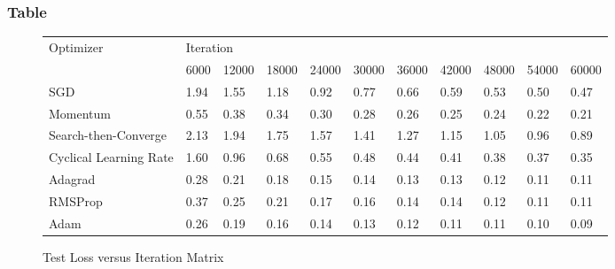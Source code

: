 \documentclass{article}
\begin{document}
\subsubsection{Table}
\begin{figure}[H]
	\begin{table}[H]
		\hskip-2.0cm\begin{tabular}{@{}|l|l|l|l|l|l|l|l|l|l|l|@{}}
			\toprule
			\multirow{2}{*}{Optimizer} & \multicolumn{10}{l|}{Iteration}                                              \\ \cmidrule(l){2-11} 
			& 6000 & 12000 & 18000 & 24000 & 30000 & 36000 & 42000 & 48000 & 54000 & 60000 \\ \midrule
			SGD                        & 1.94 & 1.55  & 1.18  & 0.92  & 0.77  & 0.66  & 0.59  & 0.53  & 0.50  & 0.47  \\ \midrule
			Momentum                   & 0.55 & 0.38  & 0.34  & 0.30  & 0.28  & 0.26  & 0.25  & 0.24  & 0.22  & 0.21  \\ \midrule
			Search-then-Converge       & 2.13 & 1.94  & 1.75  & 1.57  & 1.41  & 1.27  & 1.15  & 1.05  & 0.96  & 0.89  \\ \midrule
			Cyclical Learning Rate     & 1.60 & 0.96  & 0.68  & 0.55  & 0.48  & 0.44  & 0.41  & 0.38  & 0.37  & 0.35  \\ \midrule
			Adagrad                    & 0.28 & 0.21  & 0.18  & 0.15  & 0.14  & 0.13  & 0.13  & 0.12  & 0.11  & 0.11  \\ \midrule
			RMSProp                    & 0.37 & 0.25  & 0.21  & 0.17  & 0.16  & 0.14  & 0.14  & 0.12  & 0.11  & 0.11  \\ \midrule
			Adam                       & 0.26 & 0.19  & 0.16  & 0.14  & 0.13  & 0.12  & 0.11  & 0.11  & 0.10  & 0.09  \\ \bottomrule
		\end{tabular}
	\end{table}
	\caption{Test Loss versus Iteration Matrix}
		
\end{figure}
\end{document}
